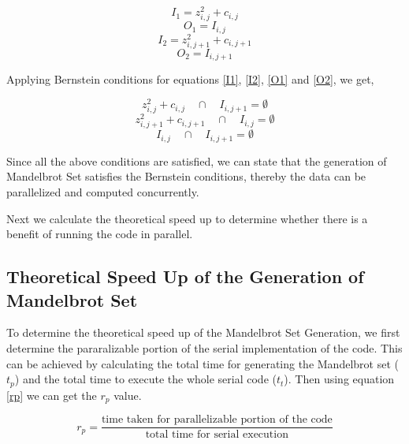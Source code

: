 \documentclass[conference]{IEEEtran}
\begin{document}
			\begin{equation}
			I_1 = z_{i,j}^2 + c_{i,j} \label{I1}
			\end{equation}
			\begin{equation}
			O_1 = I_{i,j} \label{O1}
			\end{equation}
			\begin{equation}
			I_2= z_{i,j+1}^2 + c_{i,j+1} \label{I2}
			\end{equation}
			\begin{equation}
			O_2= I_{i,j+1} \label{O2}
			\end{equation}
			
			Applying Bernstein conditions for equations \ref{I1}, \ref{I2}, \ref{O1} and \ref{O2}, we get,
			
			\begin{equation}
			z_{i,j}^2 + c_{i,j}  \quad  \cap \quad I_{i,j+1} = \emptyset
			\end{equation}
			\begin{equation}
			z_{i,j+1}^2 + c_{i,j+1} \quad  \cap \quad I_{i,j} = \emptyset 
			\end{equation}
			\begin{equation}
			I_{i,j}  \quad  \cap \quad  I_{i,j+1} = \emptyset 
			\end{equation}
			
			Since all the above conditions are satisfied, we can state that the generation of Mandelbrot Set satisfies the Bernstein conditions, thereby the data can be parallelized  and computed concurrently. 
			
			Next we calculate the theoretical speed up to determine whether there is a benefit of running the code in parallel.
			
			
			\subsection{Theoretical Speed Up of the Generation of Mandelbrot Set}
			
			To determine the theoretical speed up of the Mandelbrot Set Generation, we first determine the pararalizable portion of the serial implementation of the code. This can be achieved by calculating the total time for generating the Mandelbrot set ($t_p$) and the total time to execute the whole serial code ($t_t$). Then using equation \ref{rp} we can get the $r_p$ value.
			
			\begin{equation}
				r_p = \frac{\text{time taken for parallelizable portion of the code}}{\text{total time for serial execution}} \label{rp}
			\end{equation}
			
\end{document}
